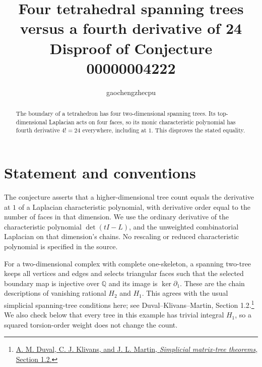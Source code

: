 \documentclass[11pt]{article}
\title{Four tetrahedral spanning trees versus a fourth derivative of 24\\
\large Disproof of Conjecture 00000004222}
\author{gaochengzhecpu}\date{}
\newcommand{\Q}{\mathbb Q}
\begin{document}
\maketitle
\begin{abstract}
The boundary of a tetrahedron has four two-dimensional spanning trees.
Its top-dimensional Laplacian acts on four faces, so its monic
characteristic polynomial has fourth derivative $4!=24$ everywhere,
including at $1$. This disproves the stated equality.
\end{abstract}

\section*{Statement and conventions}
The conjecture asserts that a higher-dimensional tree count equals the
derivative at $1$ of a Laplacian characteristic polynomial, with derivative
order equal to the number of faces in that dimension. We use the ordinary
derivative of the characteristic polynomial $\det(tI-L)$, and the
unweighted combinatorial Laplacian on that dimension's chains.
No rescaling or reduced characteristic polynomial is specified in the source.

For a two-dimensional complex with complete one-skeleton, a spanning
two-tree keeps all vertices and edges and selects triangular faces such
that the selected boundary map is injective over $\Q$ and its image is
$\ker\partial_1$. These are the chain descriptions of vanishing rational
$H_2$ and $H_1$. This agrees with the usual simplicial spanning-tree
conditions here; see Duval--Klivans--Martin, Section 1.2.\footnote{\href{https://www.dam.brown.edu/people/cklivans/SST.pdf}{A. M. Duval, C. J. Klivans, and J. L. Martin, \emph{Simplicial matrix-tree theorems}, Section 1.2.}}
We also check below that every tree in this example has trivial integral
$H_1$, so a squared torsion-order weight does not change the count.
\end{document}
